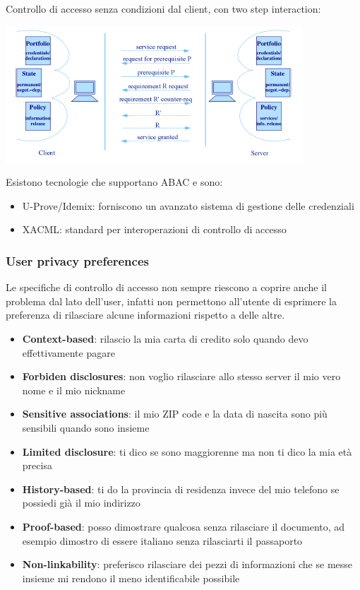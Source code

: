 Controllo di accesso senza condizioni dal client, con two step interaction:
\begin{center}
    \includegraphics[scale=0.6]{img/iac3.png}
\end{center}
Esistono tecnologie che supportano ABAC e sono:
\begin{itemize}
    \item U-Prove/Idemix: forniscono un avanzato sistema di gestione delle credenziali
    \item XACML: standard per interoperazioni di controllo di accesso
\end{itemize}

\subsubsection{User privacy preferences}
Le specifiche di controllo di accesso non sempre riescono a coprire anche il problema dal lato dell'user, infatti non permettono all'utente di esprimere la preferenza di rilasciare alcune informazioni rispetto a delle altre.
\begin{itemize}
    \item \textbf{Context-based}: rilascio la mia carta di credito solo quando devo effettivamente pagare
    \item \textbf{Forbiden disclosures}: non voglio rilasciare allo stesso server il mio vero nome e il mio nickname
    \item \textbf{Sensitive associations}: il mio ZIP code e la data di nascita sono più sensibili quando sono insieme
    \item \textbf{Limited disclosure}: ti dico se sono maggiorenne ma non ti dico la mia età precisa
    \item \textbf{History-based}: ti do la provincia di residenza invece del mio telefono se possiedi già il mio indirizzo
    \item \textbf{Proof-based}: posso dimostrare qualcosa senza rilasciare il documento, ad esempio dimostro di essere italiano senza rilasciarti il passaporto
    \item \textbf{Non-linkability}: preferisco rilasciare dei pezzi di informazioni che se messe insieme mi rendono il meno identificabile possibile
\end{itemize}


